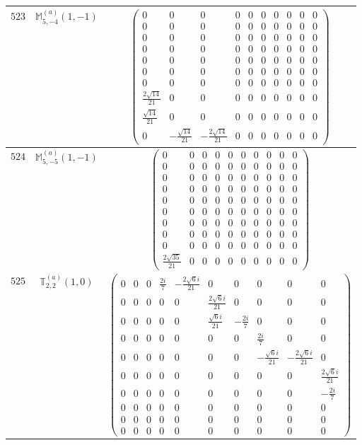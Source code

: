 \documentclass[fleqn,8pt,landscape]{jsarticle}
\begin{document}
\begin{center}
\begin{longtable}{ccc}
$ 523 $ & $ \mathbb{M}_{5,-4}^{(a)}(1,-1) $ & $ \begin{pmatrix} 0 & 0 & 0 & 0 & 0 & 0 & 0 & 0 & 0 & 0 \\ 0 & 0 & 0 & 0 & 0 & 0 & 0 & 0 & 0 & 0 \\ 0 & 0 & 0 & 0 & 0 & 0 & 0 & 0 & 0 & 0 \\ 0 & 0 & 0 & 0 & 0 & 0 & 0 & 0 & 0 & 0 \\ 0 & 0 & 0 & 0 & 0 & 0 & 0 & 0 & 0 & 0 \\ 0 & 0 & 0 & 0 & 0 & 0 & 0 & 0 & 0 & 0 \\ 0 & 0 & 0 & 0 & 0 & 0 & 0 & 0 & 0 & 0 \\ \frac{2 \sqrt{14}}{21} & 0 & 0 & 0 & 0 & 0 & 0 & 0 & 0 & 0 \\ \frac{\sqrt{14}}{21} & 0 & 0 & 0 & 0 & 0 & 0 & 0 & 0 & 0 \\ 0 & - \frac{\sqrt{14}}{21} & - \frac{2 \sqrt{14}}{21} & 0 & 0 & 0 & 0 & 0 & 0 & 0 \end{pmatrix} $ \\ \hline
$ 524 $ & $ \mathbb{M}_{5,-5}^{(a)}(1,-1) $ & $ \begin{pmatrix} 0 & 0 & 0 & 0 & 0 & 0 & 0 & 0 & 0 & 0 \\ 0 & 0 & 0 & 0 & 0 & 0 & 0 & 0 & 0 & 0 \\ 0 & 0 & 0 & 0 & 0 & 0 & 0 & 0 & 0 & 0 \\ 0 & 0 & 0 & 0 & 0 & 0 & 0 & 0 & 0 & 0 \\ 0 & 0 & 0 & 0 & 0 & 0 & 0 & 0 & 0 & 0 \\ 0 & 0 & 0 & 0 & 0 & 0 & 0 & 0 & 0 & 0 \\ 0 & 0 & 0 & 0 & 0 & 0 & 0 & 0 & 0 & 0 \\ 0 & 0 & 0 & 0 & 0 & 0 & 0 & 0 & 0 & 0 \\ 0 & 0 & 0 & 0 & 0 & 0 & 0 & 0 & 0 & 0 \\ \frac{2 \sqrt{35}}{21} & 0 & 0 & 0 & 0 & 0 & 0 & 0 & 0 & 0 \end{pmatrix} $ \\ \hline
$ 525 $ & $ \mathbb{T}_{2,2}^{(a)}(1,0) $ & $ \begin{pmatrix} 0 & 0 & 0 & \frac{2 i}{7} & - \frac{2 \sqrt{6} i}{21} & 0 & 0 & 0 & 0 & 0 \\ 0 & 0 & 0 & 0 & 0 & \frac{2 \sqrt{6} i}{21} & 0 & 0 & 0 & 0 \\ 0 & 0 & 0 & 0 & 0 & \frac{\sqrt{6} i}{21} & - \frac{2 i}{7} & 0 & 0 & 0 \\ 0 & 0 & 0 & 0 & 0 & 0 & 0 & \frac{2 i}{7} & 0 & 0 \\ 0 & 0 & 0 & 0 & 0 & 0 & 0 & - \frac{\sqrt{6} i}{21} & - \frac{2 \sqrt{6} i}{21} & 0 \\ 0 & 0 & 0 & 0 & 0 & 0 & 0 & 0 & 0 & \frac{2 \sqrt{6} i}{21} \\ 0 & 0 & 0 & 0 & 0 & 0 & 0 & 0 & 0 & - \frac{2 i}{7} \\ 0 & 0 & 0 & 0 & 0 & 0 & 0 & 0 & 0 & 0 \\ 0 & 0 & 0 & 0 & 0 & 0 & 0 & 0 & 0 & 0 \\ 0 & 0 & 0 & 0 & 0 & 0 & 0 & 0 & 0 & 0 \end{pmatrix} $ \\ \hline

\end{longtable}
\end{center}
\end{document}
